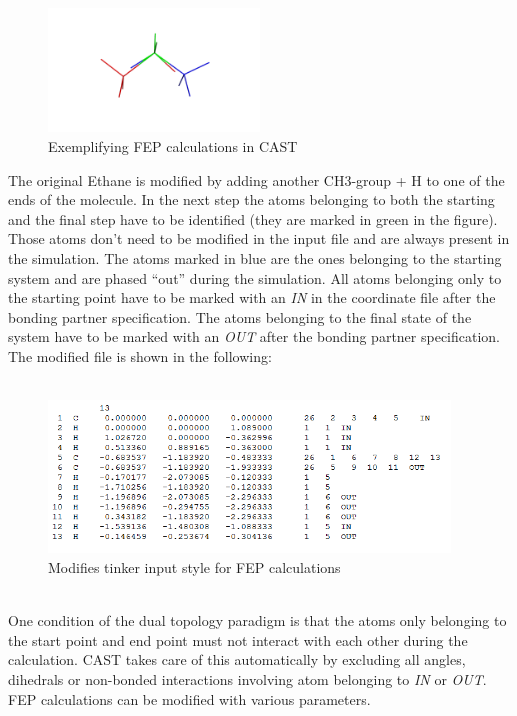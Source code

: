 \documentclass[10pt,a4paper]{article} %
\begin{document}
	\begin{figure}[h]
		\centering
		\includegraphics[width=0.5\textwidth]{img/imgfep1.png}
		\caption{Exemplifying \ac{FEP} calculations in \ac{CAST}}
		\label{fig:FEP1}
	\end{figure}
	The original Ethane is modified by adding another CH3-group + H to one of the ends of the molecule. In the next step the atoms belonging to both the starting and the final step have to be identified (they are marked in green in the figure). Those atoms don’t need to be modified in the input file and are always present in the simulation. The atoms marked in blue are the ones belonging to the starting system and are phased “out” during the simulation. All atoms belonging only to the starting point have to be marked with an \textit{IN} in the coordinate file after the bonding partner specification. The atoms belonging to the final state of the system have to be marked with an \textit{OUT} after the bonding partner specification. The modified file is shown in the following:\\~\\
	\begin{figure}[h]
		\centering
		\includegraphics[width=0.95\textwidth]{img/imgfep2.png}
		\caption{Modifies tinker input style for \ac{FEP} calculations}
		\label{fig:FEP2}
	\end{figure}~\\
	One condition of the dual topology paradigm is that the atoms only belonging to the start point and end point must not interact with each other during the calculation. \ac{CAST} takes care of this automatically by excluding all angles, dihedrals or non-bonded interactions involving atom belonging to \textit{IN} or \textit{OUT}.
	\ac{FEP} calculations can be modified with various parameters.
\end{document}
